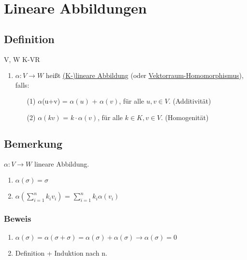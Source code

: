 \documentclass[a4paper, openany]{book}
\begin{document}
    \chapter{Lineare Abbildungen}

    \section{Definition}

    V, W K-VR

    \begin{enumerate}[label=(\alph*)]
      \item $\alpha: V \rightarrow W$ heißt \underline{(K-)lineare Abbildung} (oder \underline{Vektorraum-Homomorphismus}), falls:

        \begin{enumerate}
          \item[(1)]$\alpha$(u+v) = $\alpha(u)$ + $\alpha(v)$, für alle $u,v \in V$. (Additivität)
          \item[(2)]$\alpha(kv)$ = $k \cdot \alpha(v)$, für alle $k \in K, v \in V$. (Homogenität)
        \end{enumerate}
    \end{enumerate}

    \section{Bemerkung}

    $\alpha: V \rightarrow W$ lineare Abbildung.

    \begin{enumerate}[label=(\alph*)]
      \item $\alpha(\sigma) = \sigma$
      \item $\alpha(\sum_{i=1}^n k_i v_i)$ = $\sum_{i=1}^n k_i \alpha(v_i)$
    \end{enumerate}

    \subsection{Beweis}

    \begin{enumerate}[label=(\alph*)]
      \item $\alpha(\sigma) = \alpha(\sigma + \sigma) = \alpha(\sigma) + \alpha(\sigma) \rightarrow \alpha(\sigma) = 0$
      \item Definition + Induktion nach n.
    \end{enumerate}
\end{document}
